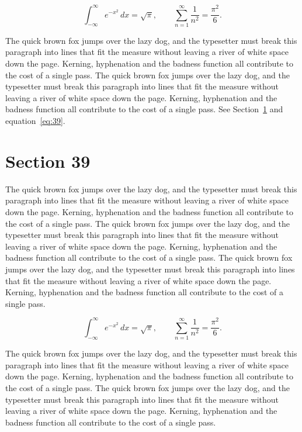\documentclass{article}
\begin{document}
\begin{equation}\label{eq:38}
\int_{-\infty}^{\infty} e^{-x^{2}}\,dx = \sqrt{\pi}, \qquad
\sum_{n=1}^{\infty} \frac{1}{n^{2}} = \frac{\pi^{2}}{6}.
\end{equation}

The quick brown fox jumps over the lazy dog, and the typesetter must break this paragraph into lines that fit the measure without leaving a river of white space down the page. Kerning, hyphenation and the badness function all contribute to the cost of a single pass. The quick brown fox jumps over the lazy dog, and the typesetter must break this paragraph into lines that fit the measure without leaving a river of white space down the page. Kerning, hyphenation and the badness function all contribute to the cost of a single pass. 
See Section~\ref{sec:39} and equation~\eqref{eq:39}.
\section{Section 39}
\label{sec:39}
The quick brown fox jumps over the lazy dog, and the typesetter must break this paragraph into lines that fit the measure without leaving a river of white space down the page. Kerning, hyphenation and the badness function all contribute to the cost of a single pass. The quick brown fox jumps over the lazy dog, and the typesetter must break this paragraph into lines that fit the measure without leaving a river of white space down the page. Kerning, hyphenation and the badness function all contribute to the cost of a single pass. The quick brown fox jumps over the lazy dog, and the typesetter must break this paragraph into lines that fit the measure without leaving a river of white space down the page. Kerning, hyphenation and the badness function all contribute to the cost of a single pass. 

\begin{equation}\label{eq:39}
\int_{-\infty}^{\infty} e^{-x^{2}}\,dx = \sqrt{\pi}, \qquad
\sum_{n=1}^{\infty} \frac{1}{n^{2}} = \frac{\pi^{2}}{6}.
\end{equation}

The quick brown fox jumps over the lazy dog, and the typesetter must break this paragraph into lines that fit the measure without leaving a river of white space down the page. Kerning, hyphenation and the badness function all contribute to the cost of a single pass. The quick brown fox jumps over the lazy dog, and the typesetter must break this paragraph into lines that fit the measure without leaving a river of white space down the page. Kerning, hyphenation and the badness function all contribute to the cost of a single pass. 
\end{document}
